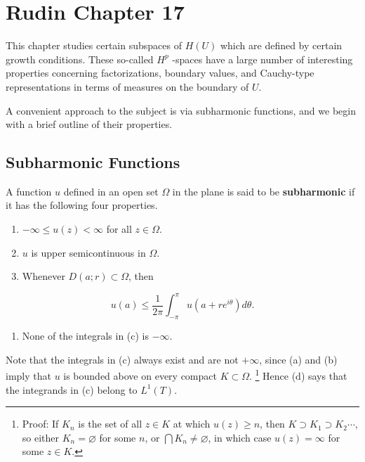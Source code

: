 \section{Rudin Chapter 17}

This chapter studies certain subspaces of $H(U)$ which are defined by certain growth conditions. These so-called $H^{p}$ -spaces have a large number of interesting properties concerning factorizations, boundary values, and Cauchy-type representations in terms of measures on the boundary of $U$.

A convenient approach to the subject is via subharmonic functions, and we begin with a brief outline of their properties.

\subsection{Subharmonic Functions}

\begin{definition}
A function $u$ defined in an open set $\Omega$ in the plane is said to be \textbf{subharmonic} if it has the following four properties.
	\begin{enumerate}
		\item $-\infty \leq u(z) < \infty$ for all $z \in \Omega$.
		\item $u$ is upper semicontinuous in $\Omega$.
		\item Whenever $D(a; r) \subset \Omega$, then
	\end{enumerate}
\[
u(a) \leq \frac{1}{2\pi} \int_{-\pi}^{\pi} u(a + re^{i\theta}) d\theta.
\]	\begin{enumerate}
		\item None of the integrals in (c) is $-\infty$.
	\end{enumerate}
\end{definition}
Note that the integrals in (c) always exist and are not $+\infty$, since (a) and (b) imply that $u$ is bounded above on every compact $K\subset\Omega$. \footnote{Proof: If $K_n$ is the set of all $z\in K$ at which $u (z)\geq n$, then $K\supset K_1\supset K_2\cdots$, so either $K_n=\varnothing$ for some $n$, or $\bigcap K_n\neq \varnothing$, in which case $u (z)=\infty$ for some $z\in K$.} Hence (d) says that the integrands in (c) belong to $L^1(T)$.

